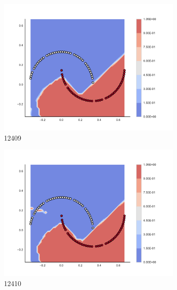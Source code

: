 \begin{figure}[h]
\begin{subfigure}[b]{0.09\textwidth}
    \includegraphics[clip, trim=2.35cm 1.75cm 4.5cm 0cm,width=\textwidth]{img/convergence/12409.pdf}
    \caption{12409}
    \label{fig:convergence_12409}
\end{subfigure}
%
\begin{subfigure}[b]{0.09\textwidth}
    \includegraphics[clip, trim=2.35cm 1.75cm 4.5cm 0cm,width=\textwidth]{img/convergence/12410.pdf}
    \caption{12410}
    \label{fig:convergence_12410}
\end{subfigure}
%
\begin{subfigure}[b]{0.09\textwidth}

\end{subfigure}
\end{figure}
